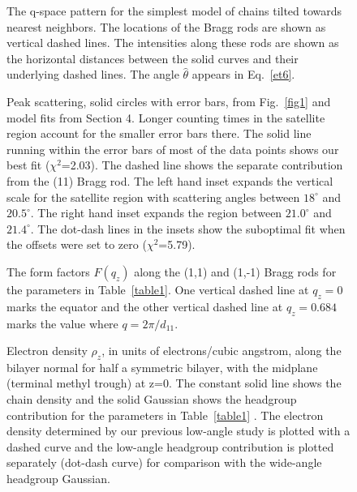 \begin{figure}
\centerline {}
\caption{The q-space pattern for the simplest model of chains tilted towards
nearest neighbors.  The locations of the Bragg rods are shown as vertical
dashed lines.  The intensities along these rods are shown as the
horizontal distances between the solid curves and their underlying dashed
lines.  The angle $\hat{\theta}$ appears in Eq.\ \protect\ref{et6}.
\label{fig9}}
\end{figure}

\begin{figure}
\centerline {}
\caption{Peak scattering, solid circles with error bars, 
from Fig.\ \protect\ref{fig1} and 
model fits from Section 4. Longer counting times in the satellite 
region account for the smaller error bars there. The solid line running 
within the error bars of most
of the data points shows our best fit (${\chi}^{2}$=2.03). The dashed line 
shows the separate 
contribution from the (11) Bragg rod. The left hand inset expands 
the vertical scale for the 
satellite region with scattering angles between $18^{\circ}$ and $20.5^{\circ}$.
The right hand inset expands the region between $21.0^{\circ}$ 
and $21.4^{\circ}$.
The dot-dash lines in the insets show the suboptimal fit when the
offsets were set to zero (${\chi}^{2}$=5.79).
\label{fig2}}
\end{figure}

\begin{figure}
\centerline {}
\caption{The form factors $F(q_{z})$ along the (1,1) and (1,-1) Bragg rods 
for the parameters in Table\ \protect\ref{table1}.  One vertical dashed 
line at $q_{z}=0$ marks the
equator and the other vertical dashed line at $q_{z}=0.684$ marks the
value where $q=2 \pi / d_{11}$.
\label{fig4}}
\end{figure}

\begin{figure}
\centerline {}
\caption{Electron density ${\rho}_{z}$, in units of electrons/cubic angstrom, 
along the bilayer normal for half a symmetric bilayer, with the midplane
(terminal methyl trough) at z=0.  The constant solid line shows the
chain density and the solid Gaussian shows the headgroup
contribution for the parameters in Table\ \protect\ref{table1} .
The electron density determined by our previous low-angle
study \protect\cite{WSN89} is plotted with a dashed curve and
the low-angle headgroup contribution is plotted 
separately (dot-dash curve) for comparison with the wide-angle
headgroup Gaussian. \label{fig5}}
\end{figure}

